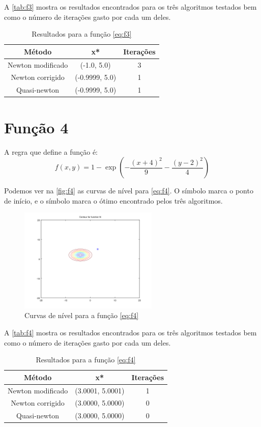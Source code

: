 \documentclass[12pt]{article}
\begin{document}
A \autoref{tab:f3} mostra os resultados encontrados para os três algoritmos testados bem como o número de iterações gasto por cada um deles.

\begin{table}[H]
\centering
\begin{tabular}{*3c}
\toprule
Método			&	x*		&	Iterações\\
\midrule
Newton modificado	&	(-1.0, 5.0)	&	3\\
Newton corrigido	&	(-0.9999, 5.0)	&	1\\
Quasi-newton		&	(-0.9999, 5.0)	&	1\\
\bottomrule
\end{tabular}
\caption{\small{Resultados para a função \autoref{eq:f3} }}
\label{tab:f3}
\end{table}



\section{Função 4}
A regra que define a função é:
\begin{equation}
\label{eq:f4}
f(x, y) = 1 - \exp(-\frac{(x+4)^2}{9} - \frac{(y-2)^2}{4})
\end{equation}

Podemos ver na \autoref{fig:f4} as curvas de nível para \autoref{eq:f4}. O símbolo \textit{\textopenbullet} marca o ponto de início,
e o símbolo \textit{\texttimes} marca o ótimo encontrado pelos três algoritmos.

\begin{figure}[H]
  \centering
  \includegraphics[width=250px]{../matlab/images/f4_contour}
  \caption{Curvas de nível para a função \autoref{eq:f4}}
  \label{fig:f4}
\end{figure}

A \autoref{tab:f4} mostra os resultados encontrados para os três algoritmos testados bem como o número de iterações gasto por cada um deles.

\begin{table}[H]
\centering
\begin{tabular}{*3c}
\toprule
Método			&	x*		&	Iterações\\
\midrule
Newton modificado	&	(3.0001, 5.0001)	&	1\\
Newton corrigido	&	(3.0000, 5.0000)	&	0\\
Quasi-newton		&	(3.0000, 5.0000)	&	0\\
\bottomrule
\end{tabular}
\caption{\small{Resultados para a função \autoref{eq:f4} }}
\label{tab:f4}
\end{table}
\end{document}
